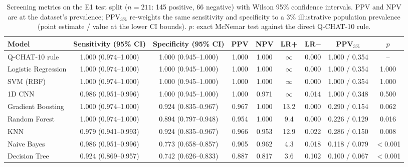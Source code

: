 \begin{table}[t]
\centering
\caption{Screening metrics on the E1 test split ($n=211$: 145 positive, 66 negative) with Wilson 95\% confidence intervals. PPV and NPV are at the dataset's prevalence; PPV$_{3\%}$ re-weights the same sensitivity and specificity to a 3\% illustrative population prevalence (point estimate / value at the lower CI bounds). $p$: exact McNemar test against the direct Q-CHAT-10 rule.}
\label{tab:clinical}
\scriptsize
\setlength{\tabcolsep}{3.5pt}
\begin{tabular}{lcccccccc}
\toprule
Model & Sensitivity (95\% CI) & Specificity (95\% CI) & PPV & NPV & LR+ & LR$-$ & PPV$_{3\%}$ & $p$ \\
\midrule
Q-CHAT-10 rule & 1.000 (0.974--1.000) & 1.000 (0.945--1.000) & 1.000 & 1.000 & $\infty$ & 0.000 & 1.000 / 0.354 & -- \\
\midrule
Logistic Regression & 1.000 (0.974--1.000) & 1.000 (0.945--1.000) & 1.000 & 1.000 & $\infty$ & 0.000 & 1.000 / 0.354 & 1.000 \\
SVM (RBF) & 1.000 (0.974--1.000) & 1.000 (0.945--1.000) & 1.000 & 1.000 & $\infty$ & 0.000 & 1.000 / 0.354 & 1.000 \\
1D CNN & 0.986 (0.951--0.996) & 1.000 (0.945--1.000) & 1.000 & 0.971 & $\infty$ & 0.014 & 1.000 / 0.348 & 0.500 \\
Gradient Boosting & 1.000 (0.974--1.000) & 0.924 (0.835--0.967) & 0.967 & 1.000 & 13.2 & 0.000 & 0.290 / 0.154 & 0.062 \\
Random Forest & 1.000 (0.974--1.000) & 0.894 (0.797--0.948) & 0.954 & 1.000 & 9.4 & 0.000 & 0.226 / 0.129 & 0.016 \\
KNN & 0.979 (0.941--0.993) & 0.924 (0.835--0.967) & 0.966 & 0.953 & 12.9 & 0.022 & 0.286 / 0.150 & 0.008 \\
Naive Bayes & 0.986 (0.951--0.996) & 0.773 (0.658--0.857) & 0.905 & 0.962 & 4.3 & 0.018 & 0.118 / 0.079 & $<$0.001 \\
Decision Tree & 0.924 (0.869--0.957) & 0.742 (0.626--0.833) & 0.887 & 0.817 & 3.6 & 0.102 & 0.100 / 0.067 & $<$0.001 \\
\bottomrule
\end{tabular}
\end{table}